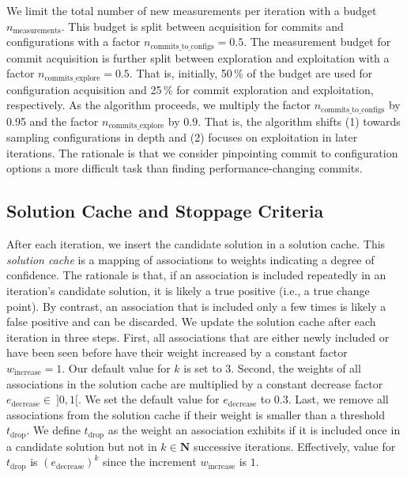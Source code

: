 \documentclass[sigconf]{acmart}
\begin{document}
	We limit the total number of new measurements per iteration with a budget $n_\text{measurements}$. This budget is split between acquisition for commits and configurations with a factor $n_\text{commits\_to\_configs} = 0.5$. The measurement budget for commit acquisition is further split between exploration and exploitation with a factor $n_\text{commits\_explore} = 0.5$. That is, initially, 50\,\% of the budget are used for configuration acquisition and 25\,\% for commit exploration and exploitation, respectively. 
	{\color{red}As the algorithm proceeds, we multiply the factor $n_\text{commits\_to\_configs}$ by 0.95 and the factor $n_\text{commits\_explore}$ by 0.9. That is, the algorithm shifts  (1) towards sampling configurations in depth and (2) focuses on exploitation in later iterations. The rationale is that we consider pinpointing commit to configuration options a more difficult task than finding performance-changing commits.}
	
	\subsection{Solution Cache and Stoppage Criteria}\label{sec:solutioncache}
	After each iteration, we insert the candidate solution in a solution cache. This \textit{solution cache} is a mapping of associations to weights indicating a degree of confidence. 
	The rationale is that, if an association is included repeatedly in an iteration's candidate solution, it is likely a true positive (i.e., a true change point). 
	By contrast, an association that is included only a few times is likely a false positive and can be discarded. 
	We update the solution cache after each iteration in three steps. 
	First, all associations that are either newly included or have been seen before have their weight increased by a constant factor $w_\text{increase} = 1$. Our default value for $k$ is set to 3.
	Second, the weights of all associations in the solution cache are multiplied by a constant decrease factor $e_\text{decrease}\in~\rbrack 0,1 \lbrack$. We set the default value for $e_\text{decrease}$ to 0.3.
	Last, we remove all associations from the solution cache if their weight is smaller than a threshold $t_\text{drop}$. We define $t_\text{drop}$ as the weight an association exhibits if it is included once in a candidate solution but not in $k \in \mathbf{N}$ successive iterations. Effectively, value for $t_\text{drop}$ is $({e_\text{decrease}})^k$ since the increment $w_\text{increase}$ is $1$.
	
\end{document}
